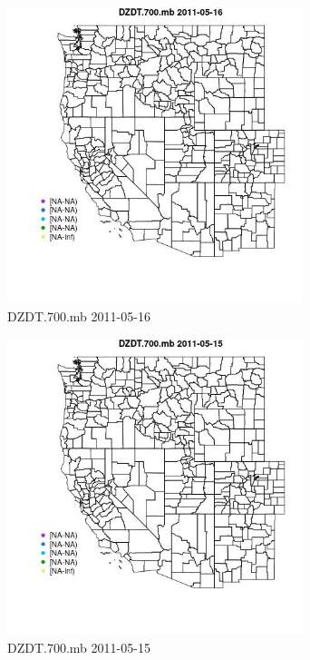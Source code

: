 \begin{figure} 
\centering  
\includegraphics[width=0.77\textwidth]{Code_Outputs/ML_input_report_ML_input_PM25_Step5_part_d_de_duplicated_aves_ML_input_MapObsDZDT700mb2011-05-16.jpg} 
\caption{\label{fig:ML_input_report_ML_input_PM25_Step5_part_d_de_duplicated_aves_ML_inputMapObsDZDT700mb2011-05-16}DZDT.700.mb 2011-05-16} 
\end{figure} 
 

\begin{figure} 
\centering  
\includegraphics[width=0.77\textwidth]{Code_Outputs/ML_input_report_ML_input_PM25_Step5_part_d_de_duplicated_aves_ML_input_MapObsDZDT700mb2011-05-15.jpg} 
\caption{\label{fig:ML_input_report_ML_input_PM25_Step5_part_d_de_duplicated_aves_ML_inputMapObsDZDT700mb2011-05-15}DZDT.700.mb 2011-05-15} 
\end{figure} 
 

